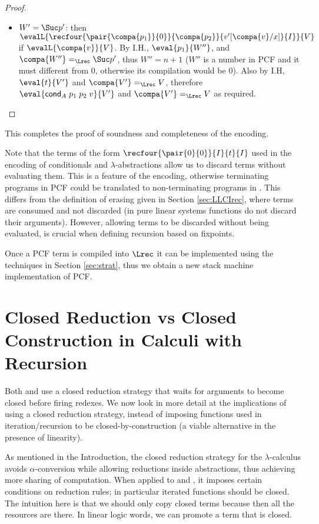 \documentclass{article}
\begin{document}
\begin{proof}
\begin{itemize}
\begin{itemize}
\item $W' = \Suc p'$: then
$\evalL{\recfour{\pair{\compa{p_1}}{0}}{\compa{p_2}}{v'[\compa{v}/x]}{I}}{V}$ if $\evalL{\compa{v}}{V}$.  By I.H., $\eval{p_1}{W''}$, and $\compa{W''}  =_{\Lrec} \Suc p'$, thus $W'' = n+1$ ($W''$ is a number in PCF and it must different from $0$, otherwise its compilation would be $0$). Also by I.H, $\eval{t}{V'}$ and $\compa{V'} =_{\Lrec} V$, therefore $\eval{\mathsf{cond}_A\;p_1\;p_2\;v}{V'}$ and $\compa{V'} =_{\Lrec} V$ as required.
\end{itemize}
\end{itemize}
\end{proof}
This completes the proof of soundness and completeness of the encoding.

Note that the terms of the form $\recfour{\pair{0}{0}}{I}{t}{I}$ used
in the encoding of conditionals and $\lambda$-abstractions allow us to
discard terms without evaluating them.  This is a feature of the
encoding, otherwise terminating programs in PCF could be translated to
non-terminating programs in \LLCIrec. This differs from the definition
of erasing given in Section \ref{sec:LLCIrec}, where terms are
consumed and not discarded (in pure linear systems functions do not
discard their arguments). However, allowing terms to be discarded
without being evaluated, is crucial when defining recursion based on
fixpoints.

Once a PCF term is compiled into $\Lrec$ it can be implemented using the
techniques in Section \ref{sec:strat}, thus we obtain a new stack
machine implementation of PCF.

\section{Closed Reduction vs Closed Construction in Calculi with Recursion}\label{sec:WRS11}
Both \LLCI and \LLCIrec use a closed reduction strategy that waits for
arguments to become closed before firing redexes. We now look in more
detail at the implications of using a closed reduction strategy,
instead of imposing functions used in iteration/recursion to be
closed-by-construction (a viable alternative in the presence of
linearity).

As mentioned in the Introduction, the closed reduction strategy for
the $\lambda$-calculus avoids $\alpha$-conversion while allowing
reductions inside abstractions, thus achieving more sharing of
computation.  When applied to \LLCI and \LLCIrec, it imposes certain
conditions on reduction rules; in particular iterated functions should
be closed. The intuition here is that we should only copy closed terms
because then all the resources are there. In linear logic words, we
can promote a term that is closed.
\end{document}
